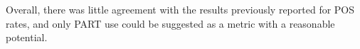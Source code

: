 %
Overall, there was little agreement with the results previously reported for POS rates, and only PART use could be suggested as a metric with a reasonable potential.



